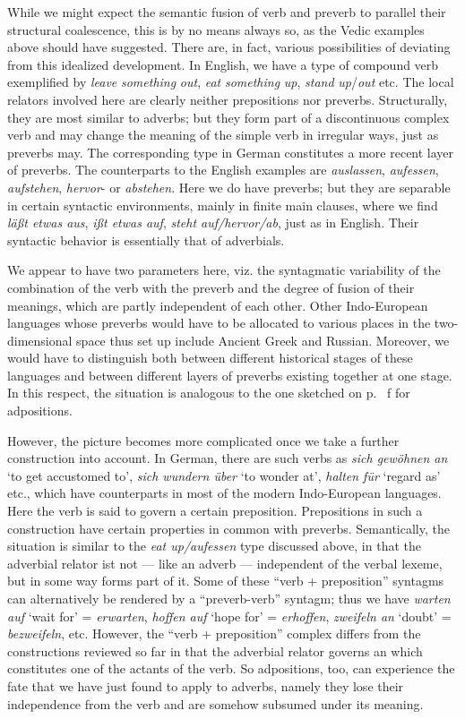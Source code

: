 While we might expect the semantic fusion of verb and preverb to parallel their structural coalescence, this is by no means always so, as the Vedic examples above should have suggested. There are, in fact, various possibilities of deviating from this idealized development. In English, we have a type of compound verb exemplified by \textit{leave} \textit{something} \textit{out}, \textit{eat} \textit{something} \textit{up}, \textit{stand} \textit{up}/\textit{out} etc. The local relators involved here are clearly neither prepositions nor preverbs. Structurally, they are most similar to adverbs; but they form part of a discontinuous complex verb and may change the meaning of the simple verb in irregular ways, just as preverbs may. The corresponding type in German constitutes a more recent layer of preverbs. The counterparts to the English examples are \textit{auslassen}, \textit{aufessen}, \textit{aufstehen}, \textit{hervor}{}- or \textit{abstehen}. Here we do have preverbs; but they are separable in certain syntactic environments, mainly in finite main clauses, where we find \textit{läßt etwas aus}, \textit{ißt etwas auf}, \textit{steht auf/hervor/ab}, just as in English. Their syntactic behavior is essentially that of adverbials.

We appear to have two parameters here, viz. the syntagmatic variability of the combination of the verb with the preverb and the degree of fusion of their meanings, which are partly independent of each other. Other Indo-European languages whose preverbs would have to be allocated to various places in the two-dimensional space thus set up include Ancient Greek and Russian. Moreover, we would have to distinguish both between different historical stages of these languages and between different layers of preverbs existing together at one stage. In this respect, the situation is analogous to the one sketched on p.~\pageref{page102}\chk%
f for adpositions.

However, the picture becomes more complicated once we take a further construction into account. In German, there are such verbs as \textit{sich gewöhnen an} ‘to get accustomed to’, \textit{sich wundern über} ‘to wonder at’, \textit{halten für} ‘regard as’ etc., which have counterparts in most of the modern Indo-European languages. Here the verb is said to govern a certain preposition. Prepositions in such a construction have certain properties in common with preverbs. Semantically, the situation is similar to the \textit{eat up/aufessen} type discussed above, in that the adverbial relator ist not — like an adverb — independent of the verbal lexeme, but in some way forms part of it. Some of these ``verb + preposition'' syntagms can alternatively be rendered by a ``preverb-verb'' syntagm; thus we have \textit{warten auf} ‘wait for’ = \textit{erwarten}, \textit{hoffen auf} ‘hope for’ = \textit{erhoffen}, \textit{zweifeln an} ‘doubt’ = \textit{bezweifeln}, etc. However, the ``verb + preposition'' complex differs from the constructions reviewed so far in that the adverbial relator governs an \np which constitutes one of the actants of the verb. So adpositions, too, can experience the fate that we have just found to apply to adverbs, namely they lose their independence from the verb and are somehow subsumed under its meaning.

